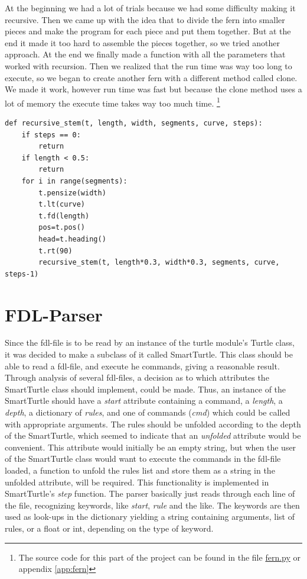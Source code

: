\documentclass[titlepage]{article}
\begin{document}
\par
At the beginning we had a lot of trials because we had some difficulty making it recursive. Then we came up with the idea that to divide the fern into smaller pieces and make the program for each piece and put them together. But at the end it made it too hard to assemble the pieces together, so we tried another approach. At the end we finally made a function with all the parameters that worked with recursion. Then we realized that the run time was way too long to execute, so we began to create another fern with a different method called clone. We made it work, however run time was fast but because the clone method uses a lot of memory the execute time takes way too much time. \footnote{The source code for this part of the project can be found in the file \href{https://github.com/ErikAndersen81/DM550-FractalProject/blob/master/fern.py}{fern.py} or appendix \ref{app:fern}}


\begin{verbatim}  
def recursive_stem(t, length, width, segments, curve, steps):
    if steps == 0:
        return
    if length < 0.5:
        return
    for i in range(segments):
        t.pensize(width)
        t.lt(curve)
        t.fd(length)
        pos=t.pos()
        head=t.heading()
        t.rt(90)
        recursive_stem(t, length*0.3, width*0.3, segments, curve, steps-1)
\end{verbatim}

\section{FDL-Parser}
Since the fdl-file is to be read by an instance of the turtle module's Turtle class, it was decided to make a subclass of it called SmartTurtle. This class should be able to read a fdl-file, and execute he commands, giving a reasonable result. Through analysis of several fdl-files, a decision as to which attributes the SmartTurtle class should implement, could be made. Thus, an instance of the SmartTurtle should have a \textit{start} attribute containing a command, a \textit{length}, a \textit{depth}, a dictionary of \textit{rules}, and one of commands (\textit{cmd}) which could be called with appropriate arguments. The rules should be unfolded according to the depth of the SmartTurtle, which seemed to indicate that an \textit{unfolded} attribute would be convenient. This attribute would initially be an empty string, but when the user of the SmartTurtle class would want to execute the commands in the fdl-file loaded, a function to unfold the rules list and store them as a string in the unfolded attribute, will be required. This functionality is implemented in SmartTurtle's \textit{step} function. The parser basically just reads through each line of the file, recognizing keywords, like \textit{start}, \textit{rule} and the like. The keywords are then used as look-ups in the dictionary yielding a string containing arguments, list of rules, or a float or int, depending on the type of keyword. 
\end{document}
